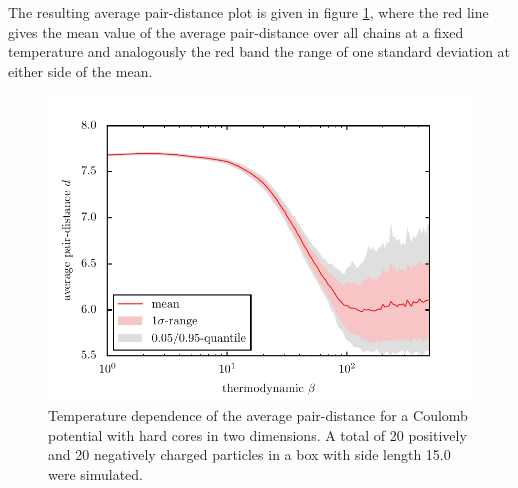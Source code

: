 \documentclass[11pt, a4paper]{article}
\numberwithin{equation}{section}
\begin{document}
The resulting average pair-distance plot is given in figure \ref{Fig:Temp_dep_Cou2D}, where the red line gives the mean value of the average pair-distance over all chains at a fixed temperature and analogously the red band the range of one standard deviation at either side of the mean.

\begin{figure}[h]
	\centering
	\includegraphics{./figures/temp_dep_coulomb2d.pdf}
	\caption{Temperature dependence of the average pair-distance for a Coulomb potential with hard cores in two dimensions.
		A total of 20 positively and 20 negatively charged particles in a box with side length 15.0 were simulated.}
	\label{Fig:Temp_dep_Cou2D}
\end{figure}
\end{document}
